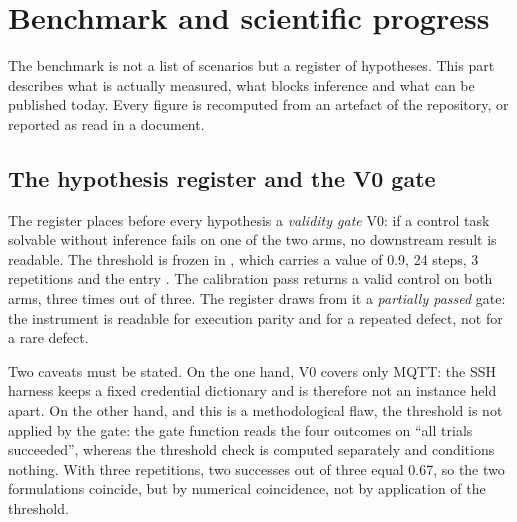 \section{Benchmark and scientific progress}
\label{sec:benchmark}

The benchmark is not a list of scenarios but a register of hypotheses. This part
describes what is actually measured, what blocks inference and what can be
published today. Every figure is recomputed from an artefact of the repository, or
reported as read in a document.

\subsection{The hypothesis register and the V0 gate}

The register places before every hypothesis a \emph{validity gate} V0: if a control
task solvable without inference fails on one of the two arms, no downstream result
is readable. The threshold is frozen in
, which carries a value of
0.9, 24 steps, 3 repetitions and the entry . The calibration
pass returns a valid control on both arms, three times out of three. The register
draws from it a \emph{partially passed} gate: the instrument is readable for
execution parity and for a repeated defect, not for a rare defect.

Two caveats must be stated. On the one hand, V0 covers only MQTT: the SSH harness
keeps a fixed credential dictionary and is therefore not an instance held apart. On
the other hand, and this is a methodological flaw, the threshold is not applied by
the gate: the gate function reads the four outcomes on ``all trials succeeded'',
whereas the threshold check is computed separately and conditions nothing. With
three repetitions, two successes out of three equal 0.67, so the two formulations
coincide, but by numerical coincidence, not by application of the threshold.

